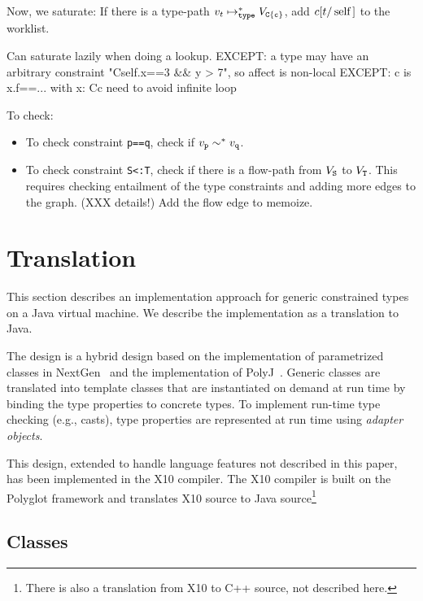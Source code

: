 \documentclass[preprint,nocopyrightspace,9pt]{sigplanconf}
\begin{document}
{Now, we saturate: 
If there is a type-path $v_t \typeedge^* V_{\tt C\{c\}}$,
add $c[t/\Xcd{self}]$ to the worklist.

        Can saturate lazily when doing a lookup.
        EXCEPT: a type may have an arbitrary constraint
                \xcd"C{self.x==3 && y > 7}", so affect is non-local
        EXCEPT: c is x.f==...
                with x: C{c}
                need to avoid infinite loop

To check:

\begin{itemize}
\item To check
constraint {\tt p==q}, check if $v_{\tt p} \eqedge^* v_{\tt q}$.
\item To check
constraint {\tt S<:T}, check if there is a flow-path from $V_{\tt S}$ to
$V_{\tt T}$.  This requires checking entailment of the type constraints and
adding more edges to the graph.  (XXX details!)
Add the flow edge to memoize.
\end{itemize}

}

\section{Translation}
\label{sec:translation}

This section describes an implementation approach for
generic constrained types on a Java virtual machine.
We describe the implementation as a translation to Java.

The design
is a hybrid design based on the implementation of parametrized classes in
NextGen~\cite{allen03,allen04} and the implementation of
PolyJ~\cite{polyj}.
Generic classes are translated into template classes
that are instantiated on demand at run time by binding the type properties
to concrete types.  To implement run-time type checking (e.g.,
casts), type properties are represented at run time
using \emph{adapter objects}.

This design, extended to handle language features
not described in this paper, has been implemented in the X10
compiler.  The X10 compiler is built on the Polyglot framework
and translates X10 source to Java source\footnote{There is also
a translation from X10 to C++ source, not described here.}

\subsection{Classes}
\end{document}
